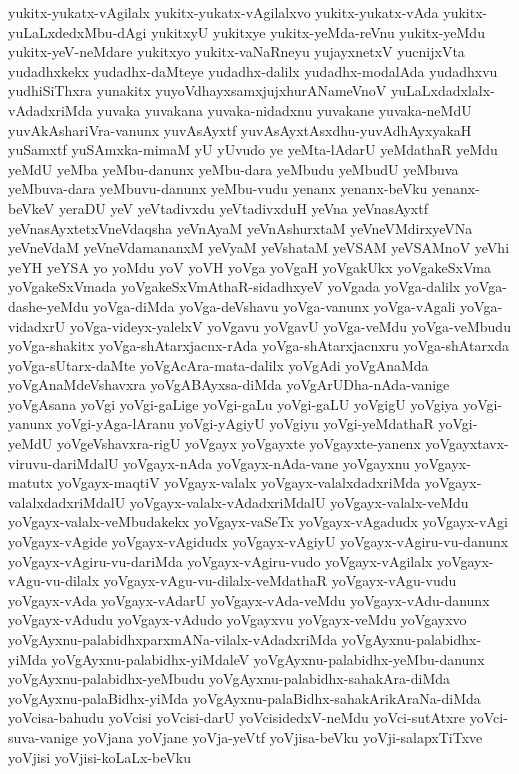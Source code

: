 {yukitx-yukatx-vAgilalx
yukitx-yukatx-vAgilalxvo
yukitx-yukatx-vAda
yukitx-yuLaLxdedxMbu-dAgi
yukitxyU
yukitxye
yukitx-yeMda-reVnu
yukitx-yeMdu
yukitx-yeV-neMdare
yukitxyo
yukitx-vaNaRneyu
yujayxnetxV
yucnijxVta
yudadhxkekx
yudadhx-daMteye
yudadhx-dalilx
yudadhx-modalAda
yudadhxvu
yudhiSiThxra
yunakitx
yuyoVdhayxsamxjujxhurANameVnoV
yuLaLxdadxlalx-vAdadxriMda
yuvaka
yuvakana
yuvaka-nidadxnu
yuvakane
yuvaka-neMdU
yuvAkAshariVra-vanunx
yuvAsAyxtf
yuvAsAyxtAsxdhu-yuvAdhAyxyakaH
yuSamxtf
yuSAmxka-mimaM
yU
yUvudo
ye
yeMta-lAdarU
yeMdathaR
yeMdu
yeMdU
yeMba
yeMbu-danunx
yeMbu-dara
yeMbudu
yeMbudU
yeMbuva
yeMbuva-dara
yeMbuvu-danunx
yeMbu-vudu
yenanx
yenanx-beVku
yenanx-beVkeV
yeraDU
yeV
yeVtadivxdu
yeVtadivxduH
yeVna
yeVnasAyxtf
yeVnasAyxtetxVneVdaqsha
yeVnAyaM
yeVnAshurxtaM
yeVneVMdirxyeVNa
yeVneVdaM
yeVneVdamananxM
yeVyaM
yeVshataM
yeVSAM
yeVSAMnoV
yeVhi
yeYH
yeYSA
yo
yoMdu
yoV
yoVH
yoVga
yoVgaH
yoVgakUkx
yoVgakeSxVma
yoVgakeSxVmada
yoVgakeSxVmAthaR-sidadhxyeV
yoVgada
yoVga-dalilx
yoVga-dashe-yeMdu
yoVga-diMda
yoVga-deVshavu
yoVga-vanunx
yoVga-vAgali
yoVga-vidadxrU
yoVga-videyx-yalelxV
yoVgavu
yoVgavU
yoVga-veMdu
yoVga-veMbudu
yoVga-shakitx
yoVga-shAtarxjacnx-rAda
yoVga-shAtarxjacnxru
yoVga-shAtarxda
yoVga-sUtarx-daMte
yoVgAcAra-mata-dalilx
yoVgAdi
yoVgAnaMda
yoVgAnaMdeVshavxra
yoVgABAyxsa-diMda
yoVgArUDha-nAda-vanige
yoVgAsana
yoVgi
yoVgi-gaLige
yoVgi-gaLu
yoVgi-gaLU
yoVgigU
yoVgiya
yoVgi-yanunx
yoVgi-yAga-lAranu
yoVgi-yAgiyU
yoVgiyu
yoVgi-yeMdathaR
yoVgi-yeMdU
yoVgeVshavxra-rigU
yoVgayx
yoVgayxte
yoVgayxte-yanenx
yoVgayxtavx-viruvu-dariMdalU
yoVgayx-nAda
yoVgayx-nAda-vane
yoVgayxnu
yoVgayx-matutx
yoVgayx-maqtiV
yoVgayx-valalx
yoVgayx-valalxdadxriMda
yoVgayx-valalxdadxriMdalU
yoVgayx-valalx-vAdadxriMdalU
yoVgayx-valalx-veMdu
yoVgayx-valalx-veMbudakekx
yoVgayx-vaSeTx
yoVgayx-vAgadudx
yoVgayx-vAgi
yoVgayx-vAgide
yoVgayx-vAgidudx
yoVgayx-vAgiyU
yoVgayx-vAgiru-vu-danunx
yoVgayx-vAgiru-vu-dariMda
yoVgayx-vAgiru-vudo
yoVgayx-vAgilalx
yoVgayx-vAgu-vu-dilalx
yoVgayx-vAgu-vu-dilalx-veMdathaR
yoVgayx-vAgu-vudu
yoVgayx-vAda
yoVgayx-vAdarU
yoVgayx-vAda-veMdu
yoVgayx-vAdu-danunx
yoVgayx-vAdudu
yoVgayx-vAdudo
yoVgayxvu
yoVgayx-veMdu
yoVgayxvo
yoVgAyxnu-palabidhxparxmANa-vilalx-vAdadxriMda
yoVgAyxnu-palabidhx-yiMda
yoVgAyxnu-palabidhx-yiMdaleV
yoVgAyxnu-palabidhx-yeMbu-danunx
yoVgAyxnu-palabidhx-yeMbudu
yoVgAyxnu-palabidhx-sahakAra-diMda
yoVgAyxnu-palaBidhx-yiMda
yoVgAyxnu-palaBidhx-sahakArikAraNa-diMda
yoVcisa-bahudu
yoVcisi
yoVcisi-darU
yoVcisidedxV-neMdu
yoVci-sutAtxre
yoVci-suva-vanige
yoVjana
yoVjane
yoVja-yeVtf
yoVjisa-beVku
yoVji-salapxTiTxve
yoVjisi
yoVjisi-koLaLx-beVku
}
